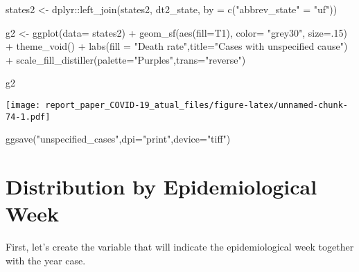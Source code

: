 \documentclass[
]{article}
\newenvironment{Shaded}{\begin{snugshade}}{\end{snugshade}}
\newcommand{\AttributeTok}[1]{\textcolor[rgb]{0.77,0.63,0.00}{#1}}
\newcommand{\DecValTok}[1]{\textcolor[rgb]{0.00,0.00,0.81}{#1}}
\newcommand{\FunctionTok}[1]{\textcolor[rgb]{0.00,0.00,0.00}{#1}}
\newcommand{\NormalTok}[1]{#1}
\newcommand{\OtherTok}[1]{\textcolor[rgb]{0.56,0.35,0.01}{#1}}
\newcommand{\SpecialCharTok}[1]{\textcolor[rgb]{0.00,0.00,0.00}{#1}}
\newcommand{\StringTok}[1]{\textcolor[rgb]{0.31,0.60,0.02}{#1}}
\begin{document}
\begin{Shaded}
\begin{Highlighting}[]
\NormalTok{states2 }\OtherTok{\textless{}{-}}\NormalTok{ dplyr}\SpecialCharTok{::}\FunctionTok{left\_join}\NormalTok{(states2, dt2\_state, }\AttributeTok{by =} \FunctionTok{c}\NormalTok{(}\StringTok{"abbrev\_state"} \OtherTok{=} \StringTok{"uf"}\NormalTok{))}

\NormalTok{g2 }\OtherTok{\textless{}{-}} \FunctionTok{ggplot}\NormalTok{(}\AttributeTok{data=}\NormalTok{ states2) }\SpecialCharTok{+}
  \FunctionTok{geom\_sf}\NormalTok{(}\FunctionTok{aes}\NormalTok{(}\AttributeTok{fill=}\NormalTok{T1), }\AttributeTok{color=} \StringTok{"grey30"}\NormalTok{, }\AttributeTok{size=}\NormalTok{.}\DecValTok{15}\NormalTok{) }\SpecialCharTok{+}
  \FunctionTok{theme\_void}\NormalTok{()  }\SpecialCharTok{+} 
  \FunctionTok{labs}\NormalTok{(}\AttributeTok{fill =} \StringTok{"Death rate"}\NormalTok{,}\AttributeTok{title=}\StringTok{"Cases with unspecified cause"}\NormalTok{)  }\SpecialCharTok{+} 
  \FunctionTok{scale\_fill\_distiller}\NormalTok{(}\AttributeTok{palette=}\StringTok{"Purples"}\NormalTok{,}\AttributeTok{trans=}\StringTok{"reverse"}\NormalTok{) }

\NormalTok{g2}
\end{Highlighting}
\end{Shaded}

\texttt{[image: report\_paper\_COVID-19\_atual\_files/figure-latex/unnamed-chunk-74-1.pdf]}

\begin{Shaded}
\begin{Highlighting}[]
\FunctionTok{ggsave}\NormalTok{(}\StringTok{"unspecified\_cases"}\NormalTok{,}\AttributeTok{dpi=}\StringTok{"print"}\NormalTok{,}\AttributeTok{device=}\StringTok{"tiff"}\NormalTok{)}
\end{Highlighting}
\end{Shaded}

\hypertarget{distribution-by-epidemiological-week}{%
\section{Distribution by Epidemiological
Week}\label{distribution-by-epidemiological-week}}

First, let's create the variable that will indicate the epidemiological
week together with the year case.
\end{document}

